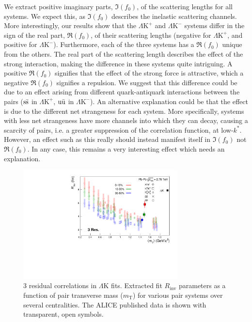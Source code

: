\documentclass[ALICE,manyauthors]{cernphprep}
\newcommand{\kstar}{$k^{*}$\xspace}
\newcommand{\mt}{$m_{\mathrm{T}}$\xspace}
\newcommand{\LamK}{$\Lambda$K\xspace}
\newcommand{\LamKchP}{$\Lambda\mathrm{K^{+}}$\xspace}
\newcommand{\LamKchM}{$\Lambda\mathrm{K^{-}}$\xspace}
\begin{document}
We extract positive imaginary parts, $\Im(f_{0})$, of the scattering lengths for all systems. 
We expect this, as $\Im(f_{0})$ describes the inelastic scattering channels.
More interestingly, our results show that the \LamKchP and \LamKchM systems differ in the sign of the real part, $\Re(f_{0})$, of their scattering lengths (negative for \LamKchP, and positive for \LamKchM).
Furthermore, each of the three systems has a $\Re(f_{0})$ unique from the others.
The real part of the scattering length describes the effect of the strong interaction, making the difference in these systems quite intriguing.
A positive $\Re(f_{0})$ signifies that the effect of the strong force is attractive, which a negative $\Re(f_{0})$ signifies a repulsion.
We suggest that this difference could be due to an effect arising from different quark-antiquark interactions between the pairs ($\rm s\bar{s}$ in \LamKchP, $\rm u\bar{u}$ in \LamKchM).
An alternative explanation could be that the effect is due to the different net strangeness for each system.
More specifically, systems with less net strangeness have more channels into which they can decay, causing a scarcity of pairs, i.e. a greater suppression of the correlation function, at low-\kstar.
However, an effect such as this really should instead manifest itself in $\Im(f_{0})$ not $\Re(f_{0})$.
In any case, this remains a very interesting effect which needs an explanation.

\begin{figure}[h]
  \centering
  \includegraphics[width=0.75\textwidth]{./mTscaling.pdf}
  \caption[\mt Scaling of Radii: 3 Residuals in Fit]{3 residual correlations in \LamK fits.  Extracted fit $R_{\mathrm{inv}}$ parameters as a function of pair transverse mass (\mt) for various pair systems over several centralities. The ALICE published data \cite{Adam:2015vja} is shown with transparent, open symbols.}
  \label{fig:mTScalingOfRadii_3Res}
\end{figure}
\end{document}

